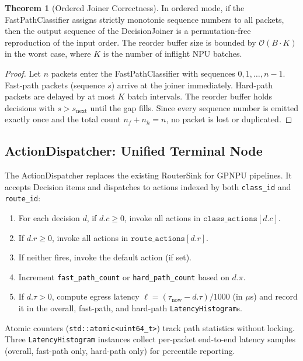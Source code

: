\documentclass[11pt,a4paper,twoside]{article}
\theoremstyle{definition}
\newtheorem{theorem}{Theorem}[section]
\theoremstyle{remark}
\newcommand{\BigO}{\mathcal{O}}
\begin{document}
\begin{theorem}[Ordered Joiner Correctness]
\label{thm:ordered-joiner}
In ordered mode, if the FastPathClassifier assigns strictly monotonic sequence numbers to all packets, then the output sequence of the DecisionJoiner is a permutation-free reproduction of the input order. The reorder buffer size is bounded by $\BigO(B \cdot K)$ in the worst case, where $K$ is the number of inflight NPU batches.
\end{theorem}

\begin{proof}
Let $n$ packets enter the FastPathClassifier with sequences $0, 1, \ldots, n-1$. Fast-path packets (sequence $s$) arrive at the joiner immediately. Hard-path packets are delayed by at most $K$ batch intervals. The reorder buffer holds decisions with $s > s_{\text{next}}$ until the gap fills. Since every sequence number is emitted exactly once and the total count $n_f + n_h = n$, no packet is lost or duplicated.
\end{proof}

\subsection{ActionDispatcher: Unified Terminal Node}

The ActionDispatcher replaces the existing RouterSink for GPNPU pipelines. It accepts Decision items and dispatches to actions indexed by both \texttt{class\_id} and \texttt{route\_id}:

\begin{enumerate}[leftmargin=*]
  \item For each decision $d$, if $d.c \geq 0$, invoke all actions in $\texttt{class\_actions}[d.c]$.
  \item If $d.r \geq 0$, invoke all actions in $\texttt{route\_actions}[d.r]$.
  \item If neither fires, invoke the default action (if set).
  \item Increment \texttt{fast\_path\_count} or \texttt{hard\_path\_count} based on $d.\pi$.
  \item If $d.\tau > 0$, compute egress latency $\ell = (\tau_{\text{now}} - d.\tau) / 1000$ (in $\mu$s) and record it in the overall, fast-path, and hard-path \texttt{LatencyHistogram}s.
\end{enumerate}

Atomic counters (\texttt{std::atomic<uint64\_t>}) track path statistics without locking. Three \texttt{LatencyHistogram} instances collect per-packet end-to-end latency samples (overall, fast-path only, hard-path only) for percentile reporting.
\end{document}
